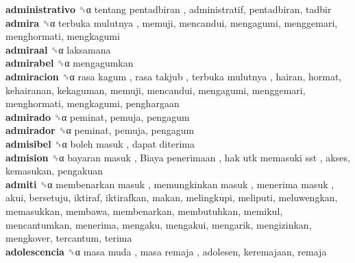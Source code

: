 \textbf{administrativo} ␝α   tentang pentadbiran , administratif, pentadbiran, tadbir  \\
\textbf{admira} ␝α   terbuka mulutnya , memuji, mencandui, mengagumi, menggemari, menghormati, mengkagumi  \\
\textbf{admiraal} ␝α  laksamana  \\
\textbf{admirabel} ␝α  mengagumkan  \\
\textbf{admiracion} ␝α   rasa kagum ,  rasa takjub ,  terbuka mulutnya , hairan, hormat, kehairanan, kekaguman, memuji, mencandui, mengagumi, menggemari, menghormati, mengkagumi, penghargaan  \\
\textbf{admirado} ␝α  peminat, pemuja, pengagum  \\
\textbf{admirador} ␝α  peminat, pemuja, pengagum  \\
\textbf{admisibel} ␝α   boleh masuk ,  dapat diterima   \\
\textbf{admision} ␝α   bayaran masuk ,  Biaya penerimaan ,  hak utk memasuki sst , akses, kemasukan, pengakuan  \\
\textbf{admiti} ␝α   membenarkan masuk ,  memungkinkan masuk ,  menerima masuk , akui, bersetuju, iktiraf, iktirafkan, makan, melingkupi, meliputi, meluwengkan, memasukkan, membawa, membenarkan, membutuhkan, memikul, mencantumkan, menerima, mengaku, mengakui, mengarik, mengizinkan, mengkover, tercantum, terima  \\
\textbf{adolescencia} ␝α   masa muda ,  masa remaja , adolesen, keremajaan, remaja  \\

